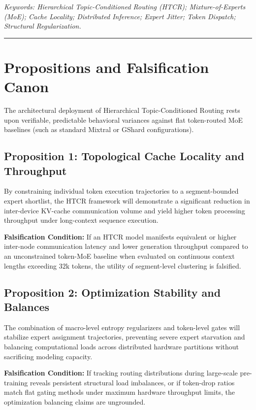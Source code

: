 \noindent \textit{Keywords: Hierarchical Topic-Conditioned Routing (HTCR); Mixture-of-Experts (MoE); Cache Locality; Distributed Inference; Expert Jitter; Token Dispatch; Structural Regularization.}

\vspace{2em}
\hrule
\vspace{2em}

\chapter{Propositions and Falsification Canon}

The architectural deployment of Hierarchical Topic-Conditioned Routing rests upon verifiable, predictable behavioral variances against flat token-routed MoE baselines (such as standard Mixtral or GShard configurations).

\section*{Proposition 1: Topological Cache Locality and Throughput}
By constraining individual token execution trajectories to a segment-bounded expert shortlist, the HTCR framework will demonstrate a significant reduction in inter-device KV-cache communication volume and yield higher token processing throughput under long-context sequence execution.

\textbf{Falsification Condition:} If an HTCR model manifests equivalent or higher inter-node communication latency and lower generation throughput compared to an unconstrained token-MoE baseline when evaluated on continuous context lengths exceeding $32\text{k}$ tokens, the utility of segment-level clustering is falsified.

\section*{Proposition 2: Optimization Stability and Balances}
The combination of macro-level entropy regularizers and token-level gates will stabilize expert assignment trajectories, preventing severe expert starvation and balancing computational loads across distributed hardware partitions without sacrificing modeling capacity.

\textbf{Falsification Condition:} If tracking routing distributions during large-scale pre-training reveals persistent structural load imbalances, or if token-drop ratios match flat gating methods under maximum hardware throughput limits, the optimization balancing claims are ungrounded.

